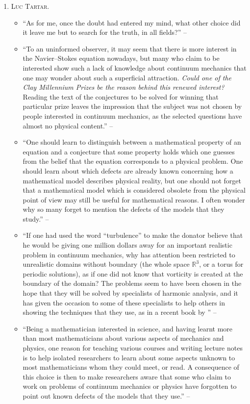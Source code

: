 \documentclass{article}
\numberwithin{equation}{section}
\begin{document}
\begin{enumerate}
	\item \textsc{Luc Tartar.}
	\begin{itemize}
		\item ``As for me, once the doubt had entered my mind, what other choice did it leave me but to search for the truth, in all fields?'' -- \cite{Tartar2006}
		\item ``To an uninformed observer, it may seem that there is more interest in the Navier--Stokes equation nowadays, but many who claim to be interested show such a lack of knowledge about continuum mechanics that one may wonder about such a superficial attraction. \textit{Could one of the Clay Millennium Prizes be the reason behind this renewed interest?} Reading the text of the conjectures to be solved for winning that particular prize leaves the impression that the subject was not chosen by people interested in continuum mechanics, as the selected questions have almost no physical content.'' -- \cite[Preface, p. vii]{Tartar2006}		
		\item ``One should learn to distinguish between a mathematical property of an equation and a conjecture that some property holds which one guesses from the belief that the equation corresponds to a physical problem. One should learn about which defects are already known concerning how a mathematical model describes physical reality, but one should not forget that a mathematical model which is considered obsolete from the physical point of view may still be useful for mathematical reasons. I often wonder why so many forget to mention the defects of the models that they study.'' -- \cite[Preface, p. vii]{Tartar2006}		
		\item ``If one had used the word ``turbulence'' to make the donator believe that he would be giving one million dollars away for an important realistic problem in continuum mechanics, why has attention been restricted to unrealistic domains without boundary (the whole space $\mathbb{R}^3$, or a torus for periodic solutions), as if one did not know that vorticity is created at the boundary of the domain? The problems seem to have been chosen in the hope that they will be solved by specialists of harmonic analysis, and it has given the occasion to some of these specialists to help others in showing the techniques that they use, as in a recent book by \cite{Lemarie-Rieusset2016}'' -- \cite[Preface, p. viii]{Tartar2006}		
		\item ``Being a mathematician interested in science, and having learnt more than most mathematicians about various aspects of mechanics and physics, one reason for teaching various courses and writing lecture notes is to help isolated researchers to learn about some aspects unknown to most mathematicians whom they could meet, or read. A consequence of this choice is then to make researchers aware that some who claim to work on problems of continuum mechanics or physics have forgotten to point out known defects of the models that they use.'' -- \cite[Preface, pp. viii--ix]{Tartar2006}

\end{itemize}
\end{enumerate}
\end{document}

